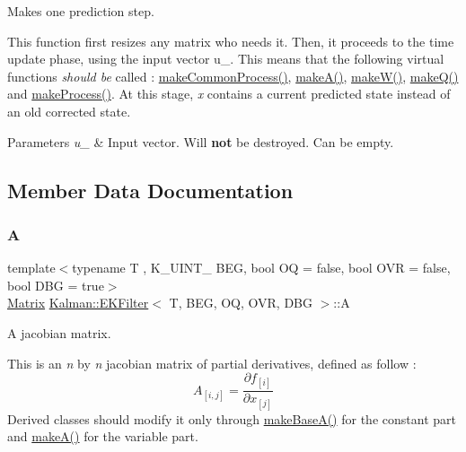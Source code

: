 Makes one prediction step. 

This function first resizes any matrix who needs it. Then, it proceeds to the time update phase, using the input vector {\ttfamily u\+\_\+}. This means that the following virtual functions {\itshape should be} called \+: {\ttfamily \mbox{\hyperlink{classKalman_1_1EKFilter_aace6f213340e7a0c78541454b13e8586}{make\+Common\+Process()}}}, {\ttfamily \mbox{\hyperlink{classKalman_1_1EKFilter_aa2cd9e16f121fe26802a133b4cb37f59}{make\+A()}}}, {\ttfamily \mbox{\hyperlink{classKalman_1_1EKFilter_ac0ea9285a523d219835f7ca2ce932902}{make\+W()}}}, {\ttfamily \mbox{\hyperlink{classKalman_1_1EKFilter_ab9765c4cbe0f67a1aa82ddfbc8173877}{make\+Q()}}} and {\ttfamily \mbox{\hyperlink{classKalman_1_1EKFilter_a778232d397d981c08b3ca23ea800aa6a}{make\+Process()}}}. At this stage, {\itshape x} contains a current predicted state instead of an old corrected state. 
\begin{DoxyParams}{Parameters}
{\em u\+\_\+} & Input vector. Will {\bfseries not} be destroyed. Can be empty. \\
\hline
\end{DoxyParams}


\subsection{Member Data Documentation}
\mbox{\label{classKalman_1_1EKFilter_a5d936cd96a598b5d8534aeb474012c5a}} 
\subsubsection{\texorpdfstring{A}{A}}
{\footnotesize\ttfamily template$<$typename T , K\+\_\+\+U\+I\+N\+T\+\_ B\+EG, bool OQ = false, bool O\+VR = false, bool D\+BG = true$>$ \\
\mbox{\hyperlink{classKalman_1_1EKFilter_a7cbc4cb4d9139a7f241b27110426af43}{Matrix}} \mbox{\hyperlink{classKalman_1_1EKFilter}{Kalman\+::\+E\+K\+Filter}}$<$ T, B\+EG, OQ, O\+VR, D\+BG $>$\+::A\hspace{0.3cm}{\ttfamily [protected]}}



A jacobian matrix. 

This is an {\itshape n} by {\itshape n} jacobian matrix of partial derivatives, defined as follow \+: \[ A_{[i,j]} = \frac{\partial f_{[i]}}{\partial x_{[j]}} \] Derived classes should modify it only through {\ttfamily \mbox{\hyperlink{classKalman_1_1EKFilter_af3eb4846dcdeaf39ab8f54624588a565}{make\+Base\+A()}}} for the constant part and {\ttfamily \mbox{\hyperlink{classKalman_1_1EKFilter_aa2cd9e16f121fe26802a133b4cb37f59}{make\+A()}}} for the variable part. \mbox{\label{classKalman_1_1EKFilter_af1976aeb370c1741133bf47528ff8e03}} 

